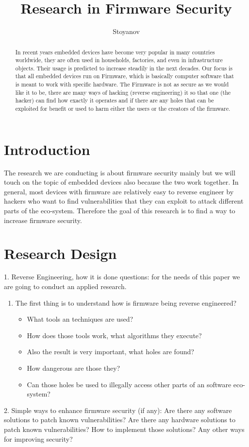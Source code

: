 \documentclass[]{report}
\title{Research in Firmware Security}
\author{Stoyanov}
\begin{document}
\maketitle

\begin{abstract}
	In recent years embedded devices have become very popular in many countries worldwide, they are often used in households, factories, and even in infrastructure objects. Their usage is predicted to increase steadily in the next decades. Our focus is that all embedded devices run on Firmware, which is basically computer software that is meant to work with specific hardware. The Firmware is not as secure as we would like it to be, there are many ways of hacking (reverse engineering) it so that one (the hacker) can find how exactly it operates and if there are any holes that can be exploited for benefit or used to harm either the users or the creators of the firmware.
\end{abstract}

\section{Introduction}
The research we are conducting is about firmware security mainly but we will touch on the topic of embedded devices also because the two work together. In general, most devices with firmware are relatively easy to reverse engineer by hackers who want to find vulnerabilities that they can exploit to attack different parts of the eco-system. Therefore the goal of this research is to find a way to increase firmware security.
\section{Research Design}
1. Reverse Engineering, how it is done questions: for the needs of this paper we are going to conduct an applied research.
\begin{enumerate}
	\item The first thing is to understand how is firmware being reverse engineered? 
 	\begin{itemize}
 	\item What tools an techniques are used? 
 	\item How does those tools work, what algorithms they execute? 
 	 \item Also the result is very important, what holes are found? 
 	\item How dangerous are those they? 
 	\item Can those holes be used to illegally access other parts of an software eco-system?
 	\end{itemize}
\end{enumerate}
2. Simple ways to enhance firmware security (if any):
Are there any software solutions to patch known vulnerabilities?
Are there any hardware solutions to patch known vulnerabilities?
How to implement those solutions?
Any other ways for improving security?
\end{document}
